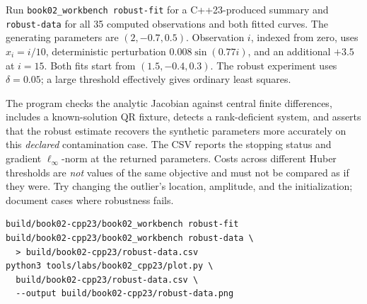 \begin{booktwolab}
Run \texttt{book02\_workbench robust-fit} for a
C++23-produced summary and \texttt{robust-data} for
all 35 computed observations and both fitted curves.
The generating parameters are \((2,-0.7,0.5)\).
Observation \(i\), indexed from zero, uses
\(x_i=i/10\), deterministic perturbation
\(0.008\sin(0.77i)\), and an additional \(+3.5\)
at \(i=15\). Both fits start from \((1.5,-0.4,0.3)\).
The robust experiment uses \(\delta=0.05\);
a large threshold effectively gives ordinary least squares.

The program checks the analytic Jacobian against
central finite differences, includes a known-solution
QR fixture, detects a rank-deficient system, and asserts
that the robust estimate recovers the synthetic parameters
more accurately on this \emph{declared} contamination case.
The CSV reports the stopping status and gradient
\(\ell_\infty\)-norm at the returned parameters. Costs
across different Huber thresholds are \emph{not}
values of the same objective and must not be compared as if
they were. Try changing the outlier's location, amplitude,
and the initialization; document cases where robustness fails.
\end{booktwolab}

\begin{Shaded}
\begin{verbatim}
build/book02-cpp23/book02_workbench robust-fit
build/book02-cpp23/book02_workbench robust-data \
  > build/book02-cpp23/robust-data.csv
python3 tools/labs/book02_cpp23/plot.py \
  build/book02-cpp23/robust-data.csv \
  --output build/book02-cpp23/robust-data.png
\end{verbatim}
\end{Shaded}
